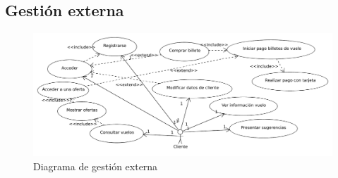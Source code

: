 \documentclass[11pt, a4paper, twoside, titlepage]{article}
\begin{document}
	
	
	
	
	
	
	
	
	
	
	
	
	
	
	
	
	
	
	
	
	
	
	
	
	
	

	\subsection{Gestión externa} \vspace{.5cm}

	\ifpdf
	\begin{figure}
		\includegraphics[scale=.93]{diagramas/gestionexterna.pdf}
		\caption{Diagrama de gestión externa}
	\end{figure}
	\fi

	
	
	
	
	
	
	
	
	
	
	
	
	
\end{document}

